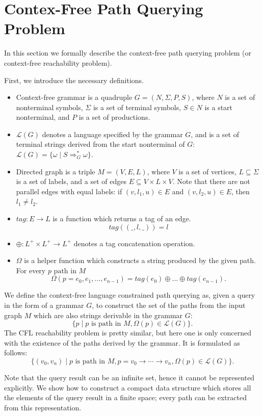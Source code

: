 \section{Contex-Free Path Querying Problem}
\label{sec:CFPQ}

In this section we formally describe the context-free path querying problem (or context-free reachability problem).

First, we introduce the necessary definitions.
\begin{itemize}
  \item Context-free grammar is a quadruple $G=(N, \Sigma, P, S)$, where $N$ is a set of nonterminal symbols, $\Sigma$ is a set of terminal symbols, $S \in N$ is a start nonterminal, and $P$ is a set of productions.
  \item $\mathcal{L}(G)$ denotes a language specified by the grammar $G$, and is a set of terminal strings derived from the start nonterminal of $G$: $\mathcal{L}(G) = \{\omega \mid S \Rightarrow_{G}^{*} \omega\}$.
  \item Directed graph is a triple $M = (V,E,L)$, where $V$ is a set of vertices, $L \subseteq \Sigma$ is a set of labels, and a set of edges $E\subseteq V\times L\times V$.
  Note that there are not parallel edges with equal labels: if $(v, l_1, u) \in E$ and $(v,l_2,u) \in E$, then $l_1 \neq l_2$.
  \item $tag: E \rightarrow L$ is a function which returns a tag of an edge. $$tag((\_,l,\_)) = l$$
  \item $\oplus: L^+ \times L^+ \rightarrow L^+$ denotes a tag concatenation operation.
  \item $\Omega$ is a helper function which constructs a string produced by the given path. For every $p \text{ path in } M$
  $$ \Omega(p = e_{0},e_{1},\dots,e_{n-1}) = tag (e_{0}) \oplus \dots \oplus tag (e_{n-1}).$$
\end{itemize}

We define the context-free language constrained path querying as, given a query in the form of a grammar $G$, to construct the set of the paths from the input graph $M$ which are also strings derivable in the grammar $G$: $$\{p \mid p \text{ is path in } M, \Omega(p) \in \mathcal{L}(G)\}.$$
The CFL reachability problem is pretty similar, but here one is only concerned with the existence of the paths derived by the grammar. It is formulated as follows: $$\{ (v_0,v_n) \mid p \text{ is path in } M, p = v_0 \rightarrow \cdots \rightarrow v_n, \Omega(p) \in \mathcal{L}(G)\}.$$

Note that the query result can be an infinite set, hence it cannot be represented explicitly.
We show how to construct a compact data structure which stores all the elements of the query result in a finite space; every path can be extracted from this representation.